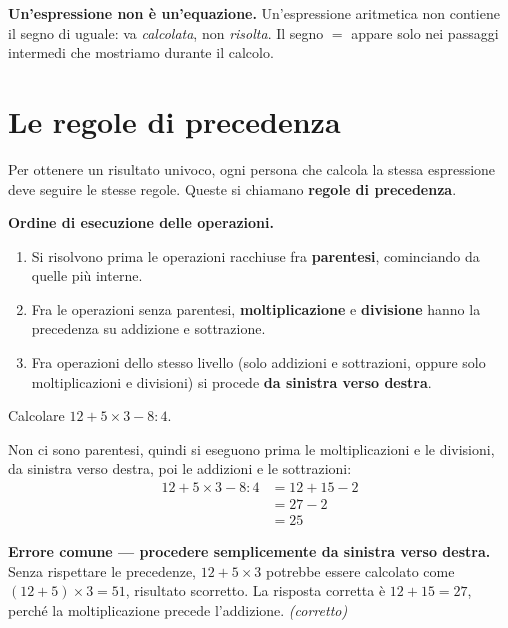 \begin{attenzione}
    \textbf{Un'espressione non è un'equazione.} Un'espressione aritmetica non
    contiene il segno di uguale: va \emph{calcolata}, non \emph{risolta}.
    Il segno $=$ appare solo nei passaggi intermedi che mostriamo durante il calcolo.
\end{attenzione}

\section{Le regole di precedenza}

Per ottenere un risultato univoco, ogni persona che calcola la stessa
espressione deve seguire le stesse regole. Queste si chiamano
\textbf{regole di precedenza}.

\begin{regola}
    \textbf{Ordine di esecuzione delle operazioni.}
    \begin{enumerate}[leftmargin=1.5em]
        \item Si risolvono prima le operazioni racchiuse fra \textbf{parentesi},
              cominciando da quelle più interne.
        \item Fra le operazioni senza parentesi, \textbf{moltiplicazione} e
              \textbf{divisione} hanno la precedenza su addizione e sottrazione.
        \item Fra operazioni dello stesso livello (solo addizioni e sottrazioni,
              oppure solo moltiplicazioni e divisioni) si procede
              \textbf{da sinistra verso destra}.
    \end{enumerate}
\end{regola}

\begin{esempio}
    Calcolare $12 + 5 \times 3 - 8 : 4$.

    Non ci sono parentesi, quindi si eseguono prima le moltiplicazioni e le divisioni,
    da sinistra verso destra, poi le addizioni e le sottrazioni:
    \begin{align*}
        12 + 5 \times 3 - 8 : 4
         & = 12 + 15 - 2 \\
         & = 27 - 2      \\
         & = 25
    \end{align*}
\end{esempio}

\begin{attenzione}
    \textbf{Errore comune — procedere semplicemente da sinistra verso destra.}
    Senza rispettare le precedenze, $12 + 5 \times 3$ potrebbe essere calcolato
    come $(12 + 5) \times 3 = 51$, risultato scorretto.
    La risposta corretta è $12 + 15 = 27$, perché la moltiplicazione precede
    l'addizione. \quad\textit{(corretto)}
\end{attenzione}

